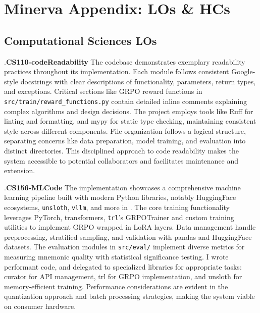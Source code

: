 \newcommand\numpara{\par\refstepcounter{para}{\thepara}.\space\textbf}

\section{Minerva Appendix: LOs \& HCs} \label{sec:minerva}

\subsection{Computational Sciences LOs} \label{sec:los}

\numpara{CS110-codeReadability} The codebase demonstrates exemplary readability practices throughout its implementation. Each module follows consistent Google-style docstrings with clear descriptions of functionality, parameters, return types, and exceptions. Critical sections like GRPO reward functions in \verb|src/train/reward_functions.py| contain detailed inline comments explaining complex algorithms and design decisions. The project employs tools like Ruff for linting and formatting, and mypy for static type checking, maintaining consistent style across different components. File organization follows a logical structure, separating concerns like data preparation, model training, and evaluation into distinct directories. This disciplined approach to code readability makes the system accessible to potential collaborators and facilitates maintenance and extension.

\numpara{CS156-MLCode} The implementation showcases a comprehensive machine learning pipeline built with modern Python libraries, notably HuggingFace ecosystems, \verb|unsloth|, \verb|vllm|, and more in . The core training functionality leverages PyTorch, transformers, \verb|trl|'s GRPOTrainer and custom training utilities to implement GRPO wrapped in LoRA layers. Data management handle preprocessing, stratified sampling, and validation with pandas and HuggingFace datasets. The evaluation modules in \verb|src/eval/| implement diverse metrics for measuring mnemonic quality with statistical significance testing. I wrote performant code, and delegated to specialized libraries for appropriate tasks: curator for API management, trl for GRPO implementation, and unsloth for memory-efficient training. Performance considerations are evident in the quantization approach and batch processing strategies, making the system viable on consumer hardware.

